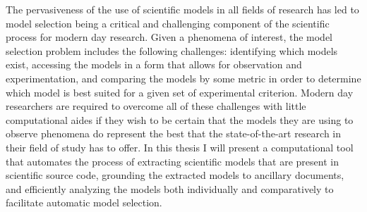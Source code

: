 The pervasiveness of the use of scientific models in all fields of research has led to model selection being a critical and challenging component of the scientific process for modern day research. Given a phenomena of interest, the model selection problem includes the following challenges: identifying which models exist, accessing the models in a form that allows for observation and experimentation, and comparing the models by some metric in order to determine which model is best suited for a given set of experimental criterion. Modern day researchers are required to overcome all of these challenges with little computational aides if they wish to be certain that the models they are using to observe phenomena do represent the best that the state-of-the-art research in their field of study has to offer. In this thesis I will present a computational tool that automates the process of extracting scientific models that are present in scientific source code, grounding the extracted models to ancillary documents, and efficiently analyzing the models both individually and comparatively to facilitate automatic model selection.
